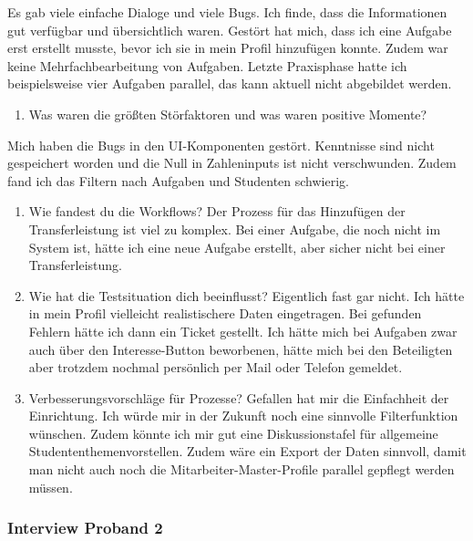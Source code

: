 \documentclass[
  12pt,
  ngerman,
  a4paper,
]{article}
\providecommand{\tightlist}{%
  \setlength{\itemsep}{0pt}\setlength{\parskip}{0pt}}
\begin{document}
Es gab viele einfache Dialoge und viele Bugs. Ich finde, dass die
Informationen gut verfügbar und übersichtlich waren. Gestört hat mich,
dass ich eine Aufgabe erst erstellt musste, bevor ich sie in mein Profil
hinzufügen konnte. Zudem war keine Mehrfachbearbeitung von Aufgaben.
Letzte Praxisphase hatte ich beispielsweise vier Aufgaben parallel, das
kann aktuell nicht abgebildet werden.

\begin{enumerate}
\def\labelenumi{\arabic{enumi}.}
\setcounter{enumi}{1}
\tightlist
\item
  Was waren die größten Störfaktoren und was waren positive Momente?
\end{enumerate}

Mich haben die Bugs in den UI-Komponenten gestört. Kenntnisse sind nicht
gespeichert worden und die Null in Zahleninputs ist nicht verschwunden.
Zudem fand ich das Filtern nach Aufgaben und Studenten schwierig.

\begin{enumerate}
\def\labelenumi{\arabic{enumi}.}
\setcounter{enumi}{2}
\item
  Wie fandest du die Workflows? Der Prozess für das Hinzufügen der
  Transferleistung ist viel zu komplex. Bei einer Aufgabe, die noch
  nicht im System ist, hätte ich eine neue Aufgabe erstellt, aber sicher
  nicht bei einer Transferleistung.
\item
  Wie hat die Testsituation dich beeinflusst? Eigentlich fast gar nicht.
  Ich hätte in mein Profil vielleicht realistischere Daten eingetragen.
  Bei gefunden Fehlern hätte ich dann ein Ticket gestellt. Ich hätte
  mich bei Aufgaben zwar auch über den Interesse-Button beworbenen,
  hätte mich bei den Beteiligten aber trotzdem nochmal persönlich per
  Mail oder Telefon gemeldet.
\item
  Verbesserungsvorschläge für Prozesse? Gefallen hat mir die Einfachheit
  der Einrichtung. Ich würde mir in der Zukunft noch eine sinnvolle
  Filterfunktion wünschen. Zudem könnte ich mir gut eine
  Diskussionstafel für allgemeine Studententhemenvorstellen. Zudem wäre
  ein Export der Daten sinnvoll, damit man nicht auch noch die
  Mitarbeiter-Master-Profile parallel gepflegt werden müssen.
\end{enumerate}

\hypertarget{interview-proband-2}{%
\subsubsection{Interview Proband 2}\label{interview-proband-2}}
\end{document}
